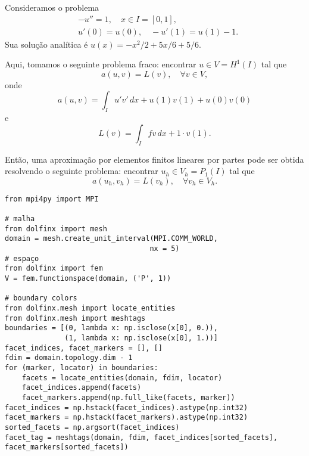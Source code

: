 \begin{ex}\label{ex:cc_r}
  Consideramos o problema
  \begin{align}
    &-u'' = 1,\quad x\in I=[0,1],\label{eq:ex_cc_r_eq}\\
    &u'(0) = u(0),\quad -u'(1) = u(1) - 1.\label{eq:ex_cc_r_bc}
  \end{align}
Sua solução analítica é $u(x) = -x^2/2+5x/6+5/6$. 

Aqui, tomamos o seguinte problema fraco: encontrar $u\in V=H^1(I)$ tal que
\begin{equation}
  a(u, v) = L(v),\quad\forall v\in V,
\end{equation}
onde
\begin{equation}
  a(u, v) = \int_I u'v'\,dx + u(1)v(1) + u(0)v(0)
\end{equation}
e
\begin{equation}
  L(v) = \int_I fv\,dx + 1\cdot v(1).
\end{equation}

Então, uma aproximação por elementos finitos lineares por partes pode ser obtida resolvendo o seguinte problema: encontrar $u_h\in V_h=P_1(I)$ tal que
\begin{equation}
  a(u_h, v_h) = L(v_h),\quad\forall v_h\in V_h.
\end{equation}



\begin{lstlisting}
from mpi4py import MPI

# malha
from dolfinx import mesh
domain = mesh.create_unit_interval(MPI.COMM_WORLD,
                                  nx = 5)
# espaço
from dolfinx import fem
V = fem.functionspace(domain, ('P', 1))

# boundary colors
from dolfinx.mesh import locate_entities
from dolfinx.mesh import meshtags
boundaries = [(0, lambda x: np.isclose(x[0], 0.)),
              (1, lambda x: np.isclose(x[0], 1.))]
facet_indices, facet_markers = [], []
fdim = domain.topology.dim - 1
for (marker, locator) in boundaries:
    facets = locate_entities(domain, fdim, locator)
    facet_indices.append(facets)
    facet_markers.append(np.full_like(facets, marker))
facet_indices = np.hstack(facet_indices).astype(np.int32)
facet_markers = np.hstack(facet_markers).astype(np.int32)
sorted_facets = np.argsort(facet_indices)
facet_tag = meshtags(domain, fdim, facet_indices[sorted_facets], facet_markers[sorted_facets])


\end{lstlisting}
\end{ex}

